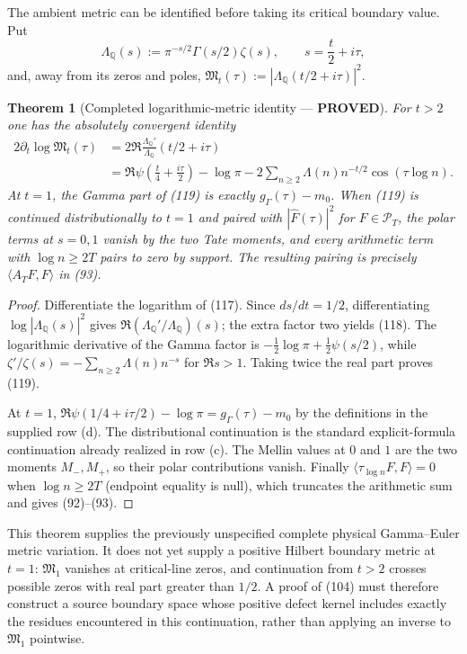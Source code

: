 \documentclass[11pt]{article}
\newtheorem{theorem}{Theorem}
\newcommand{\PROVED}{\textcolor{green!45!black}{\textbf{PROVED}}}
\begin{document}
The ambient metric can be identified before taking its critical boundary
value.  Put
\begin{equation}
 \Lambda_{\mathbb Q}(s):=\pi^{-s/2}\Gamma(s/2)\zeta(s),
 \qquad s=\frac t2+i\tau,                              \tag{117}
\end{equation}
and, away from its zeros and poles,
$\mathfrak M_t(\tau):=|\Lambda_{\mathbb Q}(t/2+i\tau)|^2$.

\begin{theorem}[Completed logarithmic-metric identity --- \PROVED]
For $t>2$ one has the absolutely convergent identity
\begin{align}
 2\partial_t\log\mathfrak M_t(\tau)
 &=2\Re\frac{\Lambda_{\mathbb Q}'}
                  {\Lambda_{\mathbb Q}}(t/2+i\tau)    \tag{118}\\
 &=\Re\psi\left(\frac t4+\frac{i\tau}{2}\right)
   -\log\pi
   -2\sum_{n\ge2}\Lambda(n)n^{-t/2}
          \cos(\tau\log n).                           \tag{119}
\end{align}
At $t=1$, the Gamma part of (119) is exactly
$g_\Gamma(\tau)-m_0$.  When (119) is continued distributionally to $t=1$
and paired with $|\widehat F(\tau)|^2$ for
$F\in\mathcal P_T$, the polar terms at $s=0,1$ vanish by the two Tate
moments, and every arithmetic term with $\log n\ge2T$ pairs to zero by
support.  The resulting pairing is precisely
$\langle A_TF,F\rangle$ in (93).
\end{theorem}

\begin{proof}
Differentiate the logarithm of (117).  Since $ds/dt=1/2$, differentiating
$\log|\Lambda_{\mathbb Q}(s)|^2$ gives
$\Re(\Lambda_{\mathbb Q}'/\Lambda_{\mathbb Q})(s)$;
the extra factor two yields (118).  The logarithmic derivative of the Gamma
factor is
$-\tfrac12\log\pi+\tfrac12\psi(s/2)$, while
$\zeta'/\zeta(s)=-\sum_{n\ge2}\Lambda(n)n^{-s}$ for
$\Re s>1$.  Taking twice the real part proves (119).

At $t=1$,
$\Re\psi(1/4+i\tau/2)-\log\pi=g_\Gamma(\tau)-m_0$ by
the definitions in the supplied row (d).  The distributional continuation
is the standard explicit-formula continuation already realized in row (c).
The Mellin values at $0$ and $1$ are the two moments $M_-,M_+$, so their
polar contributions vanish.  Finally
$\langle\tau_{\log n}F,F\rangle=0$ when $\log n\ge2T$ (endpoint equality is
null), which truncates the arithmetic sum and gives (92)--(93).
\end{proof}

This theorem supplies the previously unspecified complete physical
Gamma--Euler metric variation.  It does not yet supply a positive Hilbert
boundary metric at $t=1$: $\mathfrak M_1$ vanishes at critical-line zeros,
and continuation from $t>2$ crosses possible zeros with real part greater
than $1/2$.  A proof of (104) must therefore construct a source boundary
space whose positive defect kernel includes exactly the residues encountered
in this continuation, rather than applying an inverse to
$\mathfrak M_1$ pointwise.
\end{document}
